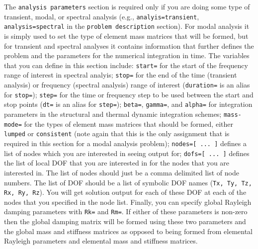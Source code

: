 The {\tt analysis parameters} section is required only if you are doing
some type of transient, modal, or spectral  analysis (e.g., 
{\tt analyis=transient}, {\tt analysis=spectral}
in the {\tt problem description} section).  For modal analysis it is simply
used to set the type of element mass matrices that will be formed, but for 
transient and spectral analyses it contains information that further defines 
the problem and the parameters for the numerical integration in time. The 
variables that you can define in this section include: {\tt start=} for
the start of the frequency range of interest in spectral analyis;
{\tt stop=} for the end of the time (transient analysis) or frequency
(spectral analysis) range of interest ({\tt duration=} is an alias for
{\tt stop=}); {\tt step=} for the time or frequency step to be used between
the start and stop points ({\tt dt=} is an alias for {\tt step=});
{\tt beta=}, {\tt gamma=}, and {\tt alpha=} for integration 
parameters in the structural and thermal dynamic integration schemes;
{\tt mass-mode=} for 
the types of element mass matrices that should be formed, either {\tt lumped}
or {\tt consistent} (note again that this is the only assignment that is 
required in this section for a modal analysis problem); {\tt nodes=[ ... ]} 
defines a list of nodes which you
are interested in seeing output for; {\tt dofs=[ ... ]} defines the list
of local DOF that you are interested in for the nodes that you are interested in.
The list of nodes should just be a comma delimited list of node numbers.
The list of DOF should be a list of symbolic DOF names ({\tt Tx, Ty, Tz, Rx,
Ry, Rz}).  You will get solution output for each of these DOF at each of the
nodes that you specified in the node list.  Finally, you can specify 
global Rayleigh damping parameters with {\tt Rk=} and {\tt Rm=}.  If either
of these parameters is non-zero then the global damping matrix will be
formed using these two parameters and the global mass and stiffness matrices
as opposed to being formed from elemental Rayleigh parameters and elemental
mass and stiffness matrices.

